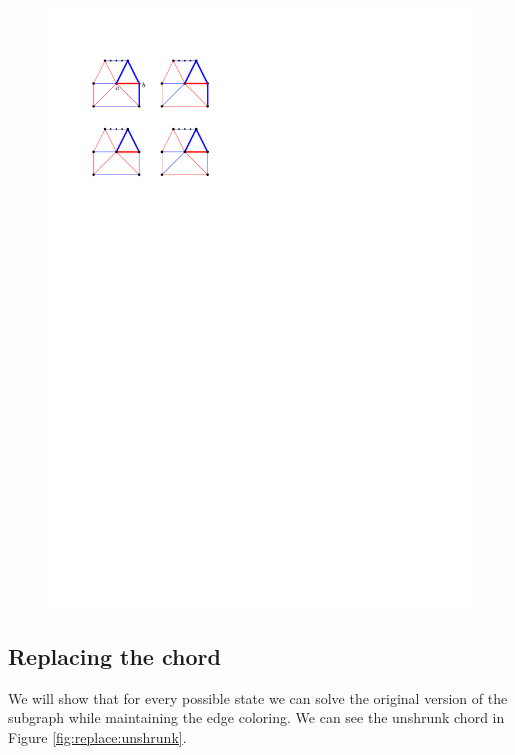 \begin{figure}[h]
  \centering
  \includegraphics[scale=1]{chordReplace/img/multiTopFan}
  \caption{}
  \label{fig:replace:multiTopFan}
\end{figure}


\subsection{Replacing the chord}

We will show that for every possible state we can solve the original version of the subgraph while maintaining the edge coloring. We can see the unshrunk chord in Figure \ref{fig:replace:unshrunk}.

